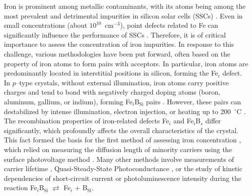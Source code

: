 \documentclass[a4paper,fleqn]{cas-sc}
\begin{document}
Iron is prominent among metallic contaminants, with its atoms being among
the most prevalent and detrimental impurities in silicon solar cells (SSCs) \cite{Buonassisi2006}.
Even in small concentrations (about $10^{10}$~cm$^{-3}$),
point defects related to Fe can significantly influence the performance of SSCs \cite{IronSC,Herguth2022}.
Therefore, it is of critical importance to assess the concentration of iron impurities.
In response to this challenge, various methodologies have been put forward,
often based on the property of iron atoms to form pairs with acceptors.
In particular, iron atoms are predominantly located in interstitial positions in silicon, forming the Fe$_i$ defect.
In $p$--type crystals, without external illumination, iron atoms carry positive charges and tend to bond with negatively charged doping atoms
(boron, aluminum, gallium, or indium), forming Fe$_i$B$_\mathrm{Si}$ pairs \cite{Kimerling1983}.
However, these pairs can destabilized by intense illumination, electron injection, or heating up to 200~$^\circ$C \cite{FeBAssJAP2014}.
The recombination properties of iron-related defects Fe$_i$ and Fe$_i$B$_s$ differ significantly,
which profoundly affects the overall characteristics of the crystal.
This fact formed the basis for the first method of assessing iron concentration \cite{Zoth1990},
which relied on measuring the diffusion length of minority carriers using the surface photovoltage method \cite{Tousek2008}.
Many other methods involve measurements of carrier lifetime \cite{Rein2,Schmidt2005},
Quasi-Steady-State Photoconductance \cite{Goodarzi2017},
or the study of kinetic dependencies of short-circuit current \cite{Olikh2021JAP}
or photoluminescence intensity \cite{FeMethod2012} during the reaction Fe$_i$B$_\mathrm{Si}$ $\rightleftarrows$ Fe$_i$ + B$_\mathrm{Si}$.
\end{document}
